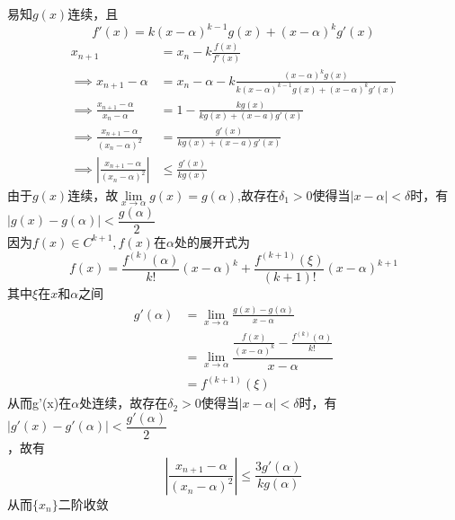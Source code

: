 \documentclass[a4paper]{article}
\begin{document}
易知$g(x)$连续，且\[
f'(x) = k(x-\alpha)^{k-1}g(x) + (x-\alpha)^kg'(x)
\]
\begin{align*}
  x_{n+1} &= x_n -k\frac{f(x)}{f'(x)}\\
  \implies x_{n+1} - \alpha&= x_n - \alpha -k\frac{(x - \alpha)^k g(x)}{k(x-\alpha)^{k-1}g(x) + (x-\alpha)^kg'(x)}\\
  \implies \frac{x_{n+1} - \alpha}{x_n - \alpha} &= 1 - \frac{kg(x)}{kg(x)+ (x-a)g'(x)}\\
  \implies \frac{x_{n+1} - \alpha}{(x_n - \alpha)^2} &= \frac{g'(x)}{kg(x)+ (x-a)g'(x)}\\
  \implies \left|\frac{x_{n+1} - \alpha}{(x_n - \alpha)^2} \right| &\leq \frac{g'(x)}{kg(x)}
\end{align*}
由于$g(x)$连续，故$\lim\limits_{x \to \alpha} g(x) = g(\alpha)$,故存在$\delta_1 > 0$使得当$|x - \alpha| < \delta$时，有$|g(x) - g(\alpha)| < \dfrac{g(\alpha)}{2}$\\
因为$f(x) \in C^{k+1},f(x)$在$\alpha$处的展开式为
\[
f(x) = \frac{f^{(k)}(\alpha)}{k!}(x-\alpha)^k + \frac{f^{(k+1)}(\xi)}{(k+1)!}(x-\alpha)^{k+1}
\]
其中$\xi$在$x$和$\alpha$之间
\begin{align*}
    g'(\alpha) &= \lim\limits_{x \to \alpha} \frac{g(x) - g(\alpha)}{x - \alpha}\\
    &= \lim\limits_{x \to \alpha} \dfrac{\frac{f(x)}{(x-\alpha)^k}-\frac{f^{(k)}(\alpha)}{k!}}{x - \alpha}\\
    &= f^{(k+1)}(\xi)
  \end{align*}
从而g'(x)在$\alpha$处连续，故存在$\delta_2 > 0$使得当$|x - \alpha| < \delta$时，有$|g'(x) - g'(\alpha)| < \dfrac{g'(\alpha)}{2}$\\
，故有
\[
\left|\frac{x_{n+1} - \alpha}{(x_n - \alpha)^2} \right| \leq \frac{3g'(\alpha)}{kg(\alpha)}
\]
从而$\{x_n\}$二阶收敛
\end{document}
